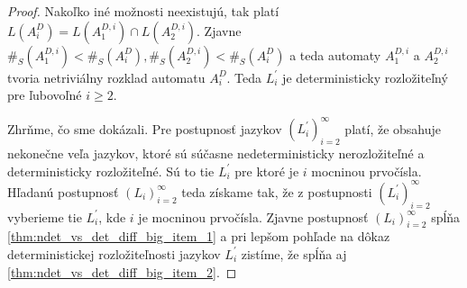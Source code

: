 \begin{proof}
Nakoľko iné možnosti neexistujú, tak platí $ L(A_i^D) = L(A_1^{D,i}) \cap L(A_2^{D,i}) $. Zjavne $ \#_S(A_1^{D,i}) < \#_S(A_i^D), \#_S(A_2^{D,i}) < \#_S(A_i^D) $ a teda automaty $ A_1^{D,i} $ a $ A_2^{D,i} $ tvoria netriviálny rozklad automatu $ A_i^D $. Teda $ L^{\prime}_i $ je deterministicky rozložiteľný pre ľubovoľné $ i \geq 2 $.
\par
Zhrňme, čo sme dokázali. Pre postupnosť jazykov $ (L^{\prime}_i)_{i=2}^{\infty} $ platí, že obsahuje nekonečne veľa jazykov, ktoré sú súčasne nedeterministicky nerozložiteľné a deterministicky rozložiteľné. Sú to tie $ L^{\prime}_i $ pre ktoré je $ i $ mocninou prvočísla. Hľadanú postupnosť $ (L_i)_{i=2}^{\infty} $ teda získame tak, že z postupnosti $ (L^{\prime}_i)_{i=2}^{\infty} $ vyberieme tie $ L^{\prime}_i $, kde $ i $ je mocninou prvočísla. Zjavne postupnosť $ (L_i)_{i=2}^{\infty} $ spĺňa \ref{thm:ndet_vs_det_diff_big_item_1} a pri lepšom pohľade na dôkaz deterministickej rozložiteľnosti jazykov $ L^{\prime}_i $ zistíme, že spĺňa aj \ref{thm:ndet_vs_det_diff_big_item_2}.

\end{proof}















